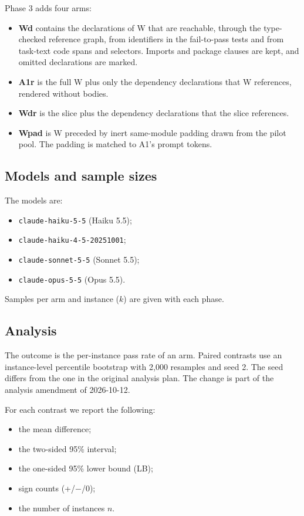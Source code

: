 \documentclass[11pt,a4paper]{article}
\begin{document}
Phase 3 adds four arms:
\begin{itemize}
\item \textbf{Wd} contains the declarations of W that are reachable, through the type-checked reference graph, from identifiers in the fail-to-pass tests and from task-text code spans and selectors. Imports and package clauses are kept, and omitted declarations are marked.
\item \textbf{A1r} is the full W plus only the dependency declarations that W references, rendered without bodies.
\item \textbf{Wdr} is the slice plus the dependency declarations that the slice references.
\item \textbf{Wpad} is W preceded by inert same-module padding drawn from the pilot pool. The padding is matched to A1's prompt tokens.
\end{itemize}

\subsection{Models and sample sizes}

The models are:
\begin{itemize}
\item \texttt{claude-haiku-5-5} (Haiku 5.5);
\item \texttt{claude-haiku-4-5-20251001};
\item \texttt{claude-sonnet-5-5} (Sonnet 5.5);
\item \texttt{claude-opus-5-5} (Opus 5.5).
\end{itemize}

Samples per arm and instance ($k$) are given with each phase.

\subsection{Analysis}

The outcome is the per-instance pass rate of an arm. Paired contrasts use an instance-level percentile bootstrap with 2,000 resamples and seed 2. The seed differs from the one in the original analysis plan. The change is part of the analysis amendment of 2026-10-12.

For each contrast we report the following:
\begin{itemize}
\item the mean difference;
\item the two-sided 95\% interval;
\item the one-sided 95\% lower bound (LB);
\item sign counts (+/$-$/0);
\item the number of instances $n$.
\end{itemize}
\end{document}
